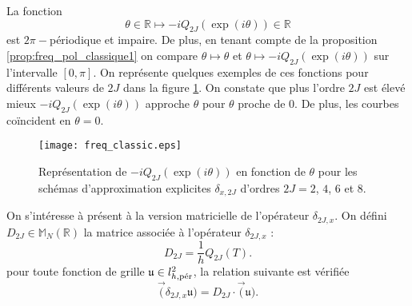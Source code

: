 La fonction
\begin{equation}
\theta \in \mathbb{R} \mapsto - i Q_{2J}(\exp(i \theta)) \in \mathbb{R}
\end{equation}
est $2 \pi -$périodique et impaire. De plus, en tenant compte de la proposition \ref{prop:freq_pol_classique1} on compare $\theta \mapsto \theta$  et $\theta \mapsto - i Q_{2J}(\exp(i \theta))$ sur l'intervalle $[0,\pi]$. On représente quelques exemples de ces fonctions pour différents valeurs de $2J$ dans la figure \ref{fig:freq_classic}. On constate que plus l'ordre $2J$ est élevé mieux $- i Q_{2J}(\exp(i \theta))$ approche $\theta$ pour $\theta$ proche de $0$. De plus, les courbes coïncident en $\theta = 0$.

\begin{figure}[htbp]
\begin{center}
\texttt{[image: freq\_classic.eps]}
\end{center}
\caption{Représentation de $-i Q_{2J}\left( \exp(i \theta) \right)$ en fonction de $\theta$ pour les schémas d'approximation explicites $\delta_{x,2J}$ d'ordres $2J = 2$, $4$, $6$ et $8$.}
\label{fig:freq_classic}
\end{figure}

On s'intéresse à présent à la version matricielle de l'opérateur $\delta_{2J,x}$. On défini $D_{2J} \in \mathbb{M}_N(\mathbb{R})$ la matrice associée à l'opérateur $\delta_{2J,x}$ :
\begin{equation}
D_{2J} = \dfrac{1}{h} Q_{2J}(T).
\end{equation}
pour toute fonction de grille $\mathfrak{u} \in l^2_{h,\per}$, la relation suivante est vérifiée
\begin{equation}
\vec(\delta_{2J,x} \mathfrak{u}) = D_{2J} \cdot \vec ( \mathfrak{u} ).
\end{equation}

